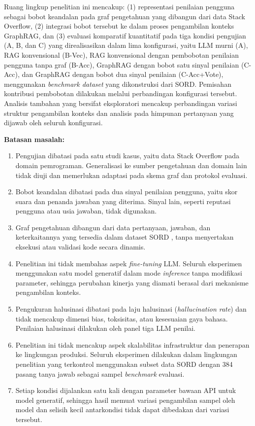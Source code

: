 Ruang lingkup penelitian ini mencakup: (1) representasi penilaian pengguna sebagai bobot keandalan pada graf pengetahuan yang dibangun dari data Stack Overflow, (2) integrasi bobot tersebut ke dalam proses pengambilan konteks GraphRAG, dan (3) evaluasi komparatif kuantitatif pada tiga kondisi pengujian (A, B, dan C) yang direalisasikan dalam lima konfigurasi, yaitu LLM murni (A), RAG konvensional (B-Vec), RAG konvensional dengan pembobotan penilaian pengguna tanpa graf (B-Acc), GraphRAG dengan bobot satu sinyal penilaian (C-Acc), dan GraphRAG dengan bobot dua sinyal penilaian (C-Acc+Vote), menggunakan \emph{benchmark dataset} yang dikonstruksi dari SORD. Pemisahan kontribusi pembobotan dilakukan melalui perbandingan konfigurasi tersebut. Analisis tambahan yang bersifat eksploratori mencakup perbandingan variasi struktur pengambilan konteks dan analisis pada himpunan pertanyaan yang dijawab oleh seluruh konfigurasi.

\textbf{Batasan masalah:}
\begin{enumerate}
    \item Pengujian dibatasi pada satu studi kasus, yaitu data Stack Overflow pada domain pemrograman. Generalisasi ke sumber pengetahuan dan domain lain tidak diuji dan memerlukan adaptasi pada skema graf dan protokol evaluasi.

    \item Bobot keandalan dibatasi pada dua sinyal penilaian pengguna, yaitu skor suara dan penanda jawaban yang diterima. Sinyal lain, seperti reputasi pengguna atau usia jawaban, tidak digunakan.

    \item Graf pengetahuan dibangun dari data pertanyaan, jawaban, dan keterkaitannya yang tersedia dalam dataset SORD \autocite{Fatima2026}, tanpa menyertakan eksekusi atau validasi kode secara dinamis.

    \item Penelitian ini tidak membahas aspek \emph{fine-tuning} LLM. Seluruh eksperimen menggunakan satu model generatif dalam mode \emph{inference} tanpa modifikasi parameter, sehingga perubahan kinerja yang diamati berasal dari mekanisme pengambilan konteks.

    \item Pengukuran halusinasi dibatasi pada laju halusinasi (\emph{hallucination rate}) dan tidak mencakup dimensi bias, toksisitas, atau kesesuaian gaya bahasa. Penilaian halusinasi dilakukan oleh panel tiga LLM penilai.

    \item Penelitian ini tidak mencakup aspek skalabilitas infrastruktur dan penerapan ke lingkungan produksi. Seluruh eksperimen dilakukan dalam lingkungan penelitian yang terkontrol menggunakan subset data SORD dengan 384 pasang tanya jawab sebagai sampel \emph{benchmark} evaluasi.

    \item Setiap kondisi dijalankan satu kali dengan parameter bawaan API untuk model generatif, sehingga hasil memuat variasi pengambilan sampel oleh model dan selisih kecil antarkondisi tidak dapat dibedakan dari variasi tersebut.

\end{enumerate}

